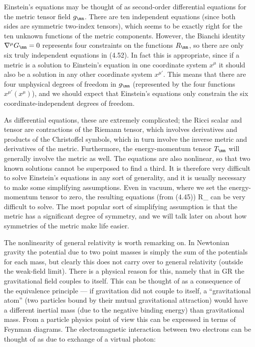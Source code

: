 Einstein's equations may be thought of as second-order differential
equations for the metric tensor field $g_\mn$.  There are ten 
independent equations (since both sides are symmetric two-index
tensors), which seems to be exactly right for the ten unknown functions
of the metric components.  However, the Bianchi identity $\nabla^\mu
G_\mn=0$ represents four constraints on the functions $R_{\mn}$, so
there are only six truly independent equations in (4.52).  In fact
this is appropriate, since if a metric is a solution to Einstein's
equation in one coordinate system $x^\mu$ it should also be a 
solution in any other coordinate system $x^{\mu'}$.  This means that
there are four unphysical degrees of freedom in $g_\mn$ (represented
by the four functions $x^{\mu'}(x^\mu)$), and we should expect that
Einstein's equations only constrain the six coordinate-independent
degrees of freedom.

As differential equations, these are
extremely complicated; the Ricci scalar and tensor are contractions 
of the Riemann tensor, which involves derivatives and products 
of the Christoffel symbols, which in turn involve the inverse metric
and derivatives of the metric.  Furthermore, the energy-momentum
tensor $T_\mn$ will generally involve the metric as well.  The
equations are also nonlinear, so that two known solutions cannot
be superposed to find a third.  It is therefore very difficult to
solve Einstein's equations in any sort of generality, and it is
usually necessary to make some simplifying assumptions.  Even
in vacuum, where we set the energy-momentum tensor to zero, the
resulting equations (from (4.45))
\be
  R_\label{4.53}
\ee
can be very difficult to solve.  The most popular sort of 
simplifying assumption is that the metric has a significant
degree of symmetry, and we will talk later on about how symmetries
of the metric make life easier.

The nonlinearity of general relativity is worth remarking on.  In
Newtonian gravity the potential due to two point masses is simply
the sum of the potentials for each mass, but clearly this does not
carry over to general relativity (outside the weak-field limit).
There is a physical reason for this, namely that in GR the
gravitational field couples to itself.  This can be thought of as
a consequence of the equivalence principle --- if gravitation did
not couple to itself, a ``gravitational atom'' (two particles
bound by their mutual gravitational attraction) would have a 
different inertial mass (due to the negative binding energy) than
gravitational mass.  From a particle physics point of view this
can be expressed in terms of Feynman diagrams.  The electromagnetic
interaction between two electrons can be thought of as due to 
exchange of a virtual photon:

